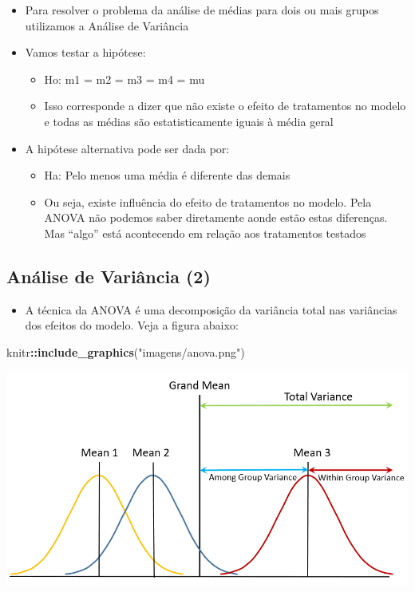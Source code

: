 \documentclass[
]{book}
\newenvironment{Shaded}{\begin{snugshade}}{\end{snugshade}}
\newcommand{\FunctionTok}[1]{\textcolor[rgb]{0.13,0.29,0.53}{\textbf{#1}}}
\newcommand{\NormalTok}[1]{#1}
\newcommand{\SpecialCharTok}[1]{\textcolor[rgb]{0.81,0.36,0.00}{\textbf{#1}}}
\newcommand{\StringTok}[1]{\textcolor[rgb]{0.31,0.60,0.02}{#1}}
\providecommand{\tightlist}{%
  \setlength{\itemsep}{0pt}\setlength{\parskip}{0pt}}
\begin{document}
\begin{itemize}
\item
  Para resolver o problema da análise de médias para dois ou mais grupos utilizamos a Análise de Variância
\item
  Vamos testar a hipótese:

  \begin{itemize}
  \tightlist
  \item
    Ho: m1 = m2 = m3 = m4 = mu
  \item
    Isso corresponde a dizer que não existe o efeito de tratamentos no modelo e todas as médias são estatisticamente iguais à média geral
  \end{itemize}
\item
  A hipótese alternativa pode ser dada por:

  \begin{itemize}
  \tightlist
  \item
    Ha: Pelo menos uma média é diferente das demais
  \item
    Ou seja, existe influência do efeito de tratamentos no modelo. Pela ANOVA não podemos saber diretamente aonde estão estas diferenças. Mas ``algo'' está acontecendo em relação aos tratamentos testados
  \end{itemize}
\end{itemize}

\subsection{Análise de Variância (2)}\label{anuxe1lise-de-variuxe2ncia-2}

\begin{itemize}
\tightlist
\item
  A técnica da ANOVA é uma decomposição da variância total nas variâncias dos efeitos do modelo. Veja a figura abaixo:
\end{itemize}

\begin{Shaded}
\begin{Highlighting}[]
\NormalTok{knitr}\SpecialCharTok{::}\FunctionTok{include\_graphics}\NormalTok{(}\StringTok{"imagens/anova.png"}\NormalTok{)}
\end{Highlighting}
\end{Shaded}

\includegraphics[width=1\linewidth]{imagens/anova}
\end{document}
